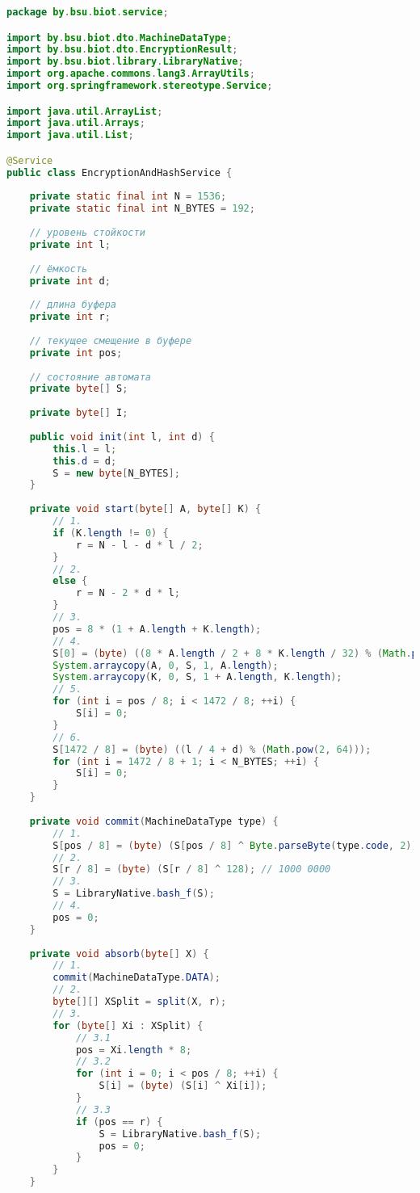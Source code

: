 
\begin{lstlisting}[language=Java,label=encr-code-java]
package by.bsu.biot.service;

import by.bsu.biot.dto.MachineDataType;
import by.bsu.biot.dto.EncryptionResult;
import by.bsu.biot.library.LibraryNative;
import org.apache.commons.lang3.ArrayUtils;
import org.springframework.stereotype.Service;

import java.util.ArrayList;
import java.util.Arrays;
import java.util.List;

@Service
public class EncryptionAndHashService {
	
	private static final int N = 1536;
	private static final int N_BYTES = 192;
	
	// уровень стойкости
	private int l;
	
	// ёмкость
	private int d;
	
	// длина буфера
	private int r;
	
	// текущее смещение в буфере
	private int pos;
	
	// состояние автомата
	private byte[] S;
	
	private byte[] I;
	
	public void init(int l, int d) {
		this.l = l;
		this.d = d;
		S = new byte[N_BYTES];
	}
	
	private void start(byte[] A, byte[] K) {
		// 1.
		if (K.length != 0) {
			r = N - l - d * l / 2;
		}
		// 2.
		else {
			r = N - 2 * d * l;
		}
		// 3.
		pos = 8 * (1 + A.length + K.length);
		// 4.
		S[0] = (byte) ((8 * A.length / 2 + 8 * K.length / 32) % (Math.pow(2, 8)));
		System.arraycopy(A, 0, S, 1, A.length);
		System.arraycopy(K, 0, S, 1 + A.length, K.length);
		// 5.
		for (int i = pos / 8; i < 1472 / 8; ++i) {
			S[i] = 0;
		}
		// 6.
		S[1472 / 8] = (byte) ((l / 4 + d) % (Math.pow(2, 64)));
		for (int i = 1472 / 8 + 1; i < N_BYTES; ++i) {
			S[i] = 0;
		}
	}
	
	private void commit(MachineDataType type) {
		// 1.
		S[pos / 8] = (byte) (S[pos / 8] ^ Byte.parseByte(type.code, 2));
		// 2.
		S[r / 8] = (byte) (S[r / 8] ^ 128); // 1000 0000
		// 3.
		S = LibraryNative.bash_f(S);
		// 4.
		pos = 0;
	}
	
	private void absorb(byte[] X) {
		// 1.
		commit(MachineDataType.DATA);
		// 2.
		byte[][] XSplit = split(X, r);
		// 3.
		for (byte[] Xi : XSplit) {
			// 3.1
			pos = Xi.length * 8;
			// 3.2
			for (int i = 0; i < pos / 8; ++i) {
				S[i] = (byte) (S[i] ^ Xi[i]);
			}
			// 3.3
			if (pos == r) {
				S = LibraryNative.bash_f(S);
				pos = 0;
			}
		}
	}
	

\end{lstlisting}
